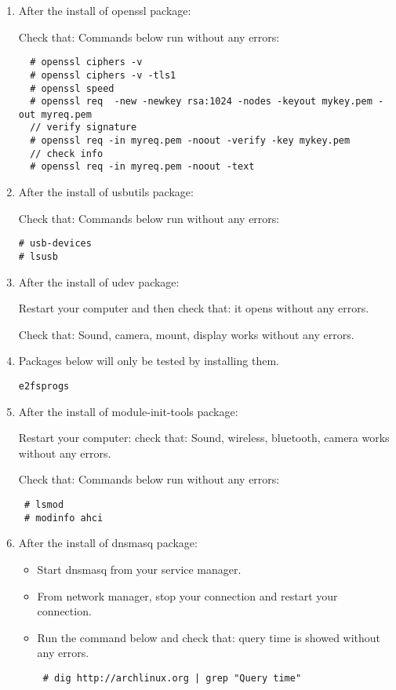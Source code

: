 \documentclass[a4paper,10pt]{article}
\begin{document}
\begin{enumerate}
\item After the install of openssl package:

Check that: Commands below run without any errors:
\begin{verbatim}
  # openssl ciphers -v 
  # openssl ciphers -v -tls1
  # openssl speed
  # openssl req  -new -newkey rsa:1024 -nodes -keyout mykey.pem -out myreq.pem
  // verify signature
  # openssl req -in myreq.pem -noout -verify -key mykey.pem
  // check info
  # openssl req -in myreq.pem -noout -text

\end{verbatim}


\item After the install of usbutils package:

Check that: Commands below run without any errors:
\begin{verbatim}
# usb-devices
# lsusb
\end{verbatim}


\item After the install of udev package:

Restart your computer and then check that: it opens without any errors. 

Check that: Sound, camera, mount, display works without any errors.
\item Packages below will only be tested by installing them.
\begin{verbatim}
e2fsprogs 
\end{verbatim}
\item After the install of module-init-tools package:

Restart your computer:
check that: Sound, wireless, bluetooth, camera works without any errors.

Check that: Commands below run without any errors:
\begin{verbatim}
 # lsmod
 # modinfo ahci
\end{verbatim}


\item After the install of dnsmasq package:

\begin{itemize}
 \item Start dnsmasq from your service manager.
 \item From network manager, stop your connection and restart your connection.
 \item Run the command below and  check that: query time is showed without any errors.
\begin{verbatim}
 # dig http://archlinux.org | grep "Query time"
\end{verbatim}


\end{itemize}
\end{enumerate}
\end{document}
